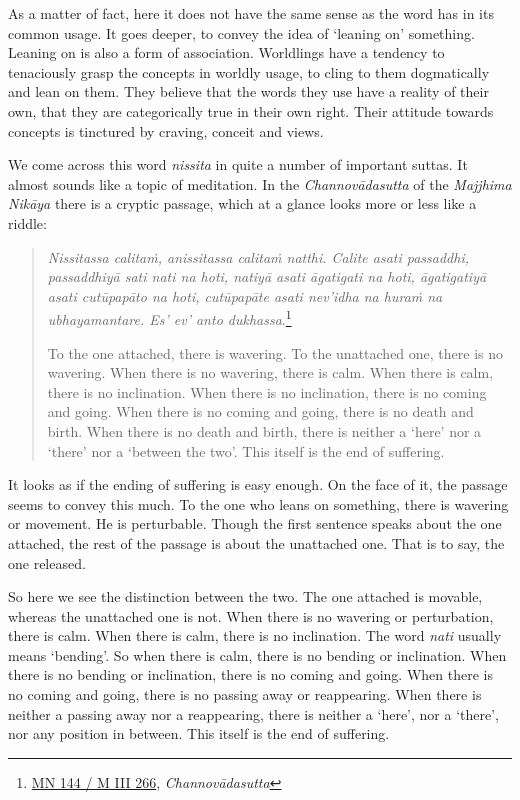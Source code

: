 As a matter of fact, here it does not have the same sense as the word has in its common usage. It goes deeper, to convey the idea of `leaning on' something. Leaning on is also a form of association. Worldlings have a tendency to tenaciously grasp the concepts in worldly usage, to cling to them dogmatically and lean on them. They believe that the words they use have a reality of their own, that they are categorically true in their own right. Their attitude towards concepts is tinctured by craving, conceit and views.

We come across this word \emph{nissita} in quite a number of important suttas. It almost sounds like a topic of meditation. In the \emph{Channovādasutta} of the \emph{Majjhima Nikāya} there is a cryptic passage, which at a glance looks more or less like a riddle:

\begin{quote}
\emph{Nissitassa calitaṁ, anissitassa calitaṁ natthi. Calite asati passaddhi, passaddhiyā sati nati na hoti, natiyā asati āgatigati na hoti, āgatigatiyā asati cutūpapāto na hoti, cutūpapāte asati nev'idha na huraṁ na ubhayamantare. Es' ev' anto dukhassa}.\footnote{\href{https://suttacentral.net/mn144/pli/ms}{MN 144 / M III 266}, \emph{Channovādasutta}}

To the one attached, there is wavering. To the unattached one, there is no wavering. When there is no wavering, there is calm. When there is calm, there is no inclination. When there is no inclination, there is no coming and going. When there is no coming and going, there is no death and birth. When there is no death and birth, there is neither a `here' nor a `there' nor a `between the two'. This itself is the end of suffering.
\end{quote}

It looks as if the ending of suffering is easy enough. On the face of it, the passage seems to convey this much. To the one who leans on something, there is wavering or movement. He is perturbable. Though the first sentence speaks about the one attached, the rest of the passage is about the unattached one. That is to say, the one released.

So here we see the distinction between the two. The one attached is movable, whereas the unattached one is not. When there is no wavering or perturbation, there is calm. When there is calm, there is no inclination. The word \emph{nati} usually means `bending'. So when there is calm, there is no bending or inclination. When there is no bending or inclination, there is no coming and going. When there is no coming and going, there is no passing away or reappearing. When there is neither a passing away nor a reappearing, there is neither a `here', nor a `there', nor any position in between. This itself is the end of suffering.

